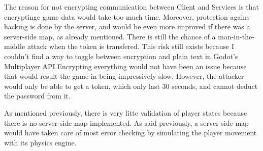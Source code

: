 \documentclass{article}
\begin{document}
The reason for not encrypting communication between Client and Services is that encryptinge game data would take too much time. Moreover, protection agains hacking is done by the server, and would be even more improved if there was a server-side map, as already mentioned. There is still the chance of a man-in-the-middle attack when the token is transfered. This risk still exists because I couldn't find a way to toggle between encryption and plain text in Godot's Multiplayer API.Encrypting everything would not have been an issue because that would result the game in being impressively slow. However, the attacker would only be able to get a token, which only last 30 seconds, and cannot deduct the password from it. 

As mentioned previously, there is very litte validation of player states because there is no server-side map implemented. As said previously, a server-side map would have taken care of most error checking by simulating the player movement with its physics engine.
\end{document}
